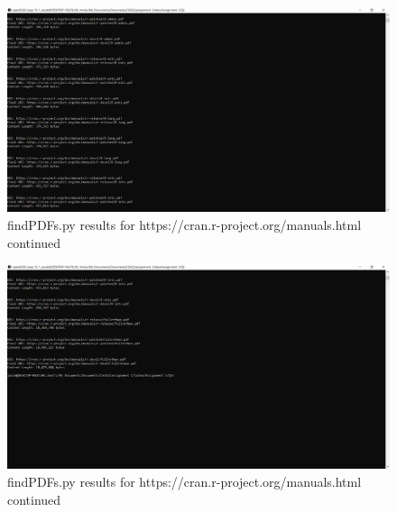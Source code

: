 \documentclass[12pt]{article}
\begin{document}
\begin{figure}[H]
    \centering
    \includegraphics[trim=0 0 400 140, clip, width=\textwidth] {Q3/q3_cranRManuals2.png}
    \caption{findPDFs.py results for https://cran.r-project.org/manuals.html continued}
    \label{fig:q3ResponsecranR_2}
\end{figure}

\begin{figure}[H]
    \centering
    \includegraphics[trim=0 270 400 10, clip, width=\textwidth] {Q3/q3_cranRManuals3.png}
    \caption{findPDFs.py results for https://cran.r-project.org/manuals.html continued}
    \label{fig:q3ResponsecranR_3}
\end{figure}
\end{document}
